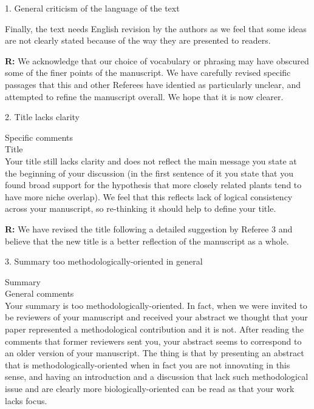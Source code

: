 \documentclass[12pt]{letter}
\newenvironment{refquote}{\bigskip \begin{it}}{\end{it}\smallskip}
\begin{document}
	1. General criticism of the language of the text

		\begin{refquote}

		Finally, the text needs English revision by the authors as we feel that some ideas are not clearly stated because of the way they are presented to readers. 

		\end{refquote}


		\textbf{R:} We acknowledge that our choice of vocabulary or phrasing may have obscured some of the finer points of the manuscript. We have carefully revised specific passages that this and other Referees have identied as particularly unclear, and attempted to refine the manuscript overall. We hope that it is now clearer.


	2. Title lacks clarity

		\begin{refquote}
		Specific comments\\
		Title\\
		Your title still lacks clarity and does not reflect the main message you state at the beginning of your discussion (in the first sentence of it you state that you found broad support for the hypothesis that more closely related plants tend to have more niche overlap). We feel that this reflects lack of logical consistency across your manuscript, so re-thinking it should help to define your title.
		\end{refquote}

		\textbf{R:} We have revised the title following a detailed suggestion by Referee 3 and believe that the new title is a better reflection of the manuscript as a whole.


	3. Summary too methodologically-oriented in general

		\begin{refquote}
			Summary\\
			General comments\\
			Your summary is too methodologically-oriented. In fact, when we were invited to be reviewers of your manuscript and received your abstract we thought that your paper represented a methodological contribution and it is not. After reading the comments that former reviewers sent you, your abstract seems to correspond to an older version of your manuscript. The thing is that by presenting an abstract that is methodologically-oriented when in fact you are not innovating in this sense, and having an introduction and a discussion that lack such methodological issue and are clearly more biologically-oriented can be read as that your work lacks focus.
		\end{refquote}
\end{document}
